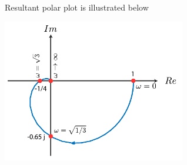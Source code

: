 \documentclass[twoside]{article}
\begin{document}
Resultant polar plot is illustrated below

\vspace{6 pt}

  \begin{minipage}[h]{1\linewidth}
    \begin{center}
      \includegraphics[width=0.6\textwidth]{polar5}
    \end{center}
  \end{minipage}

\vspace{6 pt}

\end{document}
